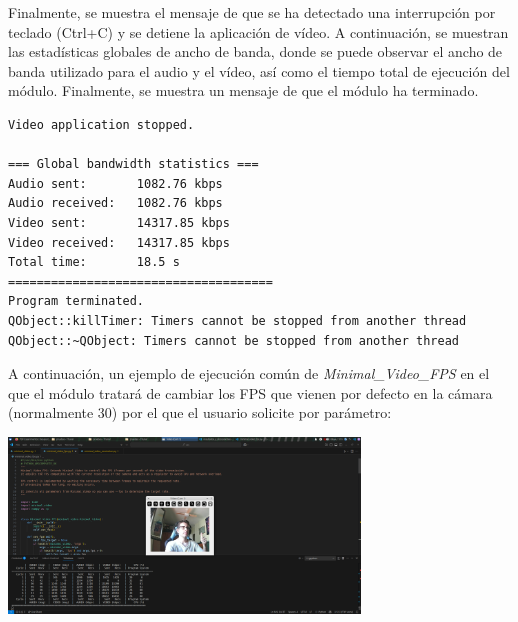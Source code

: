Finalmente, se muestra el mensaje de que se ha detectado una interrupción por teclado (Ctrl+C) y se detiene la aplicación de vídeo. A continuación, se muestran las estadísticas globales de ancho de banda, donde se puede observar el ancho de banda utilizado para el audio y el vídeo, así como el tiempo total de ejecución del módulo. Finalmente, se muestra un mensaje de que el módulo ha terminado.
\begin{lstlisting}[language=bash,basicstyle=\ttfamily\scriptsize]
Video application stopped.

=== Global bandwidth statistics ===
Audio sent:       1082.76 kbps
Audio received:   1082.76 kbps
Video sent:       14317.85 kbps
Video received:   14317.85 kbps
Total time:       18.5 s
=====================================
Program terminated.
QObject::killTimer: Timers cannot be stopped from another thread
QObject::~QObject: Timers cannot be stopped from another thread
\end{lstlisting}
\vspace{\baselineskip}

A continuación, un ejemplo de ejecución común de \textit{Minimal\_Video\_FPS} en el que el módulo tratará de cambiar los FPS que vienen por defecto en la cámara (normalmente 30) por el que el usuario solicite por parámetro:
\begin{center}
	\includegraphics[width = 0.7\textwidth]{images/pruebas/ejecuion_normal_fps.png}
	\label{fig:ejecucion_fps}
\end{center}
\vspace{\baselineskip}

\newpage

